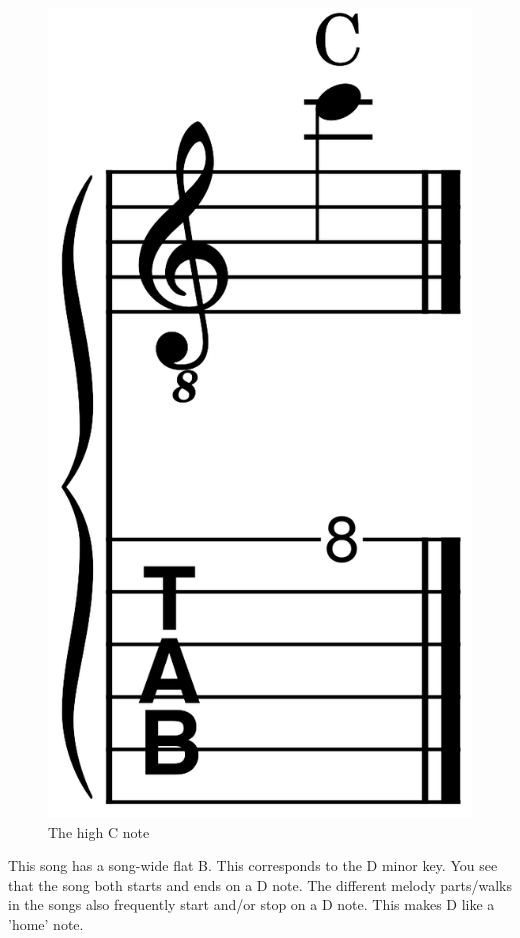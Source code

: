 \begin{figure}[h]
	\centering
	\includegraphics[height=0.12\textheight]{../../MuseScore/Guitar/GuitarNotesHighC.png}
	\caption{The high C note}
	\label{fig:guitar_note_high_c}
\end{figure}

This song has a song-wide flat B. This corresponds to the D minor key. You see that the song both starts and ends on a D note. The different melody parts/walks in the songs also frequently start and/or stop on a D note. This makes D like a 'home' note.

